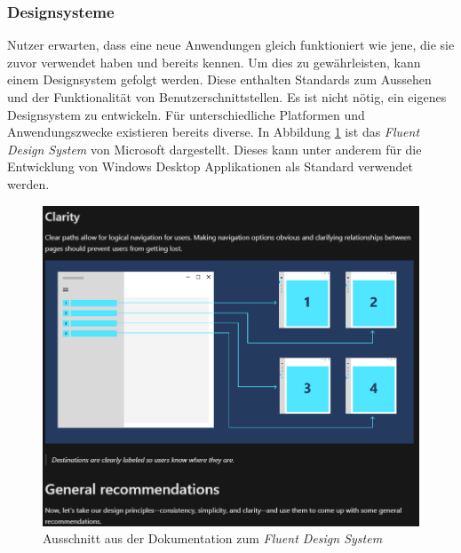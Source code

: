 \subsubsection{Designsysteme}
Nutzer erwarten, dass eine neue Anwendungen gleich funktioniert wie jene, die sie zuvor verwendet haben und bereits kennen.
Um dies zu gewährleisten, kann einem Designsystem gefolgt werden.
Diese enthalten Standards zum Aussehen und der Funktionalität von Benutzerschnittstellen.
Es ist nicht nötig, ein eigenes Designsystem zu entwickeln.
Für unterschiedliche Platformen und Anwendungszwecke existieren bereits diverse.
In Abbildung \ref{fig:fluent} ist das \textit{Fluent Design System} von Microsoft dargestellt.
Dieses kann unter anderem für die Entwicklung von Windows Desktop Applikationen als Standard verwendet werden.
\begin{figure}[H]
   \centering
   \includegraphics[width=1.0\textwidth]{gfx/design_system_ms.png}
   \caption{
      Ausschnitt aus der Dokumentation zum \textit{Fluent Design System}
   }
   \label{fig:fluent}
\end{figure}